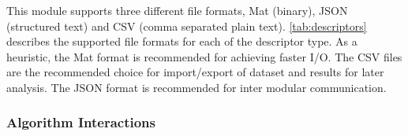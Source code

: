 This module supports three different file formats, Mat (binary), JSON (structured text) and CSV (comma separated plain text). \tablename \ref{tab:descriptors} describes the supported file formats for each of the descriptor type.  As a heuristic, the Mat format is recommended for achieving faster I/O. The CSV files are the recommended choice for import/export of dataset and results for later analysis. The JSON format is recommended for inter modular communication. 

\subsubsection{Algorithm Interactions}

\begin{figure}
	\centering
	\hfil
	\centering
	\hfil
	\centering
\end{figure}
